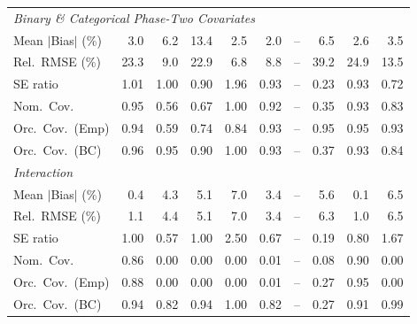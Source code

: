 \begin{table}[!htbp]
{\begin{tabular}{lrrrrrrrrr}
\midrule
\multicolumn{10}{l}{\textit{Binary \& Categorical Phase-Two Covariates}} \\[2pt]
\quad Mean $|$Bias$|$ (\%) & 3.0 & 6.2 & 13.4 & \cellcolor{ranktwo}2.5 & \cellcolor{rankone}2.0 & -- & 6.5 & \cellcolor{rankthree}2.6 & 3.5 \\
\quad Rel.\ RMSE (\%) & 23.3 & \cellcolor{rankthree}9.0 & 22.9 & \cellcolor{rankone}6.8 & \cellcolor{ranktwo}8.8 & -- & 39.2 & 24.9 & 13.5 \\
\quad SE ratio & \cellcolor{ranktwo}1.01 & \cellcolor{rankone}1.00 & 0.90 & 1.96 & \cellcolor{rankthree}0.93 & -- & 0.23 & \cellcolor{rankthree}0.93 & 0.72 \\
\quad Nom.\ Cov. & \cellcolor{rankone}0.95 & 0.56 & 0.67 & 1.00 & \cellcolor{rankthree}0.92 & -- & 0.35 & \cellcolor{ranktwo}0.93 & 0.83 \\
\quad Orc.\ Cov.\ (Emp) & \cellcolor{ranktwo}0.94 & 0.59 & 0.74 & 0.84 & \cellcolor{rankthree}0.93 & -- & \cellcolor{rankone}0.95 & \cellcolor{rankone}0.95 & \cellcolor{rankthree}0.93 \\
\quad Orc.\ Cov.\ (BC) & \cellcolor{ranktwo}0.96 & \cellcolor{rankone}0.95 & 0.90 & 1.00 & \cellcolor{rankthree}0.93 & -- & 0.37 & \cellcolor{rankthree}0.93 & 0.84 \\
\midrule
\multicolumn{10}{l}{\textit{Interaction}} \\[2pt]
\quad Mean $|$Bias$|$ (\%) & \cellcolor{ranktwo}0.4 & 4.3 & 5.1 & 7.0 & \cellcolor{rankthree}3.4 & -- & 5.6 & \cellcolor{rankone}0.1 & 6.5 \\
\quad Rel.\ RMSE (\%) & \cellcolor{ranktwo}1.1 & 4.4 & 5.1 & 7.0 & \cellcolor{rankthree}3.4 & -- & 6.3 & \cellcolor{rankone}1.0 & 6.5 \\
\quad SE ratio & \cellcolor{rankone}1.00 & 0.57 & \cellcolor{rankone}1.00 & 2.50 & \cellcolor{rankthree}0.67 & -- & 0.19 & \cellcolor{ranktwo}0.80 & 1.67 \\
\quad Nom.\ Cov. & \cellcolor{ranktwo}0.86 & 0.00 & 0.00 & 0.00 & 0.01 & -- & \cellcolor{rankthree}0.08 & \cellcolor{rankone}0.90 & 0.00 \\
\quad Orc.\ Cov.\ (Emp) & \cellcolor{ranktwo}0.88 & 0.00 & 0.00 & 0.00 & 0.01 & -- & \cellcolor{rankthree}0.27 & \cellcolor{rankone}0.95 & 0.00 \\
\quad Orc.\ Cov.\ (BC) & \cellcolor{rankone}0.94 & 0.82 & \cellcolor{rankone}0.94 & \cellcolor{rankthree}1.00 & 0.82 & -- & 0.27 & \cellcolor{ranktwo}0.91 & \cellcolor{ranktwo}0.99 \\
\bottomrule
\end{tabular}}
\end{table}

